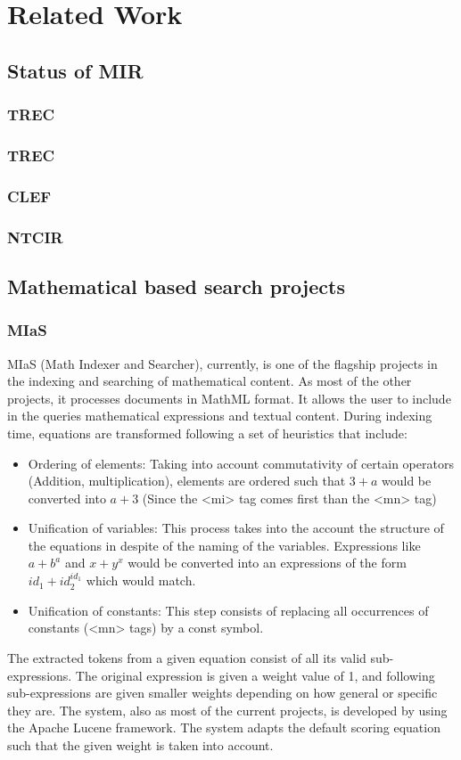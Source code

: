 \chapter{Related Work}
\label{chapter-related_work}
\section{Status of MIR}
\subsection{TREC}
\subsection{TREC}
\subsection{CLEF}
\subsection{NTCIR}
\section{Mathematical based search projects}
\subsection{MIaS}
MIaS\cite{mias_1} (Math Indexer and Searcher), currently, is one of the flagship projects in the indexing and searching of mathematical content. As most of the other projects, it processes documents in MathML format. It allows the user to include in the queries mathematical expressions and textual content. During indexing time, equations are transformed following a set of heuristics that include:
\begin{itemize}
  \item Ordering of elements: Taking into account commutativity of certain operators (Addition, multiplication), elements are ordered such that $3 + a$ would be converted into $a + 3$ (Since the <mi> tag comes first than the <mn> tag)
  \item Unification of variables: This process takes into the account the structure of the equations in despite of the naming of the variables. Expressions like $a+b^a$ and $x+y^x$ would be converted into an expressions of the form $id_1 + id_2^{id_1}$ which would match.
  \item Unification of constants: This step consists of replacing all occurrences of constants (<mn> tags) by a const symbol. 
\end{itemize}
The extracted tokens from a given equation consist of all its valid sub-expressions. The original expression is given a weight value of 1, and following sub-expressions are given smaller weights depending on how general or specific they are.  
The system, also as most of the current projects, is developed by using the Apache Lucene framework. The system adapts the default scoring equation such that the given weight is taken into account.  
